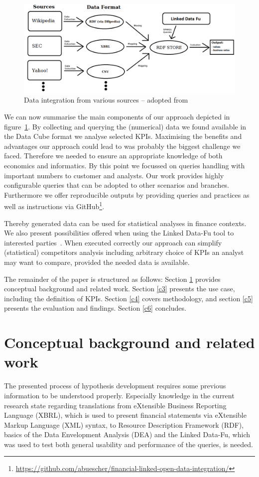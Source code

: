 \documentclass[runningheads]{llncs}
\begin{document}
\begin{figure}[htb]
\centering
\includegraphics[scale=0.2]{1_graphics/extract_neu.png}
\caption{Data integration from various sources -- adopted from \cite{KWOW14}}\label{fig:overview}
\end{figure}

We can now summarise the main components of our approach depicted in figure~\ref{fig:overview}.
By collecting and querying the (numerical) data we found available in the Data Cube format we analyse selected KPIs. %
Maximising the benefits and advantages our approach could lead to was probably the biggest challenge we faced.
Therefore we needed to ensure an appropriate knowledge of both economics and informatics.
By this point we focussed on queries handling with important numbers to customer and analysts.
Our work provides highly configurable queries that can be adopted to other scenarios and branches.
Furthermore we offer reproducible outputs by providing queries and practices as well as instructions via GitHub\footnote{\url{https://github.com/abuescher/financial-linked-open-data-integration/}}.

Thereby generated data can be used for statistical analyses in finance contexts.
We also present possibilities offered when using the Linked Data-Fu tool to interested parties~\cite{SSHS13}.
When executed correctly our approach can simplify (statistical) competitors analysis including arbitrary choice of KPIs an analyst may want to compare, provided the needed data is available.

The remainder of the paper is structured as follows:
Section \ref{c2} provides conceptual background and related work.
Section \ref{c3} presents the use case, including the definition of KPIs.
Section \ref{c4} covers methodology, and section \ref{c5} presents the evaluation and findings.
Section \ref{c6} concludes.

\section{Conceptual background and related work}\label{c2}
The presented process of hypothesis development requires some previous information to be understood properly.
Especially knowledge in the current research state regarding translations from eXtensible Business Reporting Language (XBRL), which is used to present financial statements via eXtensible Markup Language (XML) syntax, to Resource Description Framework (RDF), basics of the Data Envelopment Analysis (DEA) and the Linked Data-Fu, which was used to test both general usability and performance of the queries, is needed.
\end{document}
